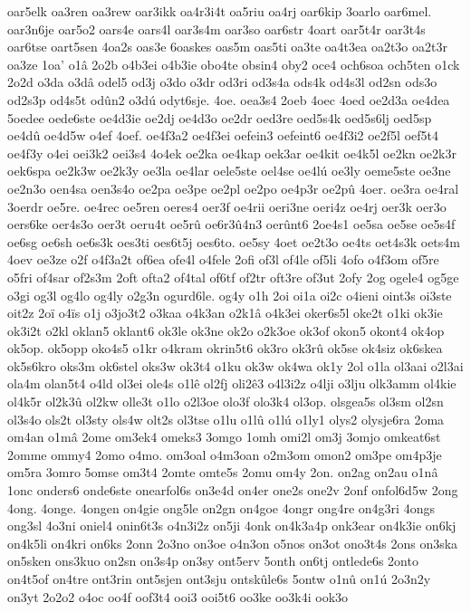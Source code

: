 {oar5elk
oa3ren
oa3rew
oar3ikk
oa4r3i4t
oa5riu
oa4rj
oar6kip
3oarlo
oar6mel.
oar3n6je
oar5o2
oars4e
oars4l
oar3s4m
oar3so
oar6str
4oart
oar5t4r
oar3t4s
oar6tse
oart5sen
4oa2s
oas3e
6oaskes
oas5m
oas5ti
oa3te
oa4t3ea
oa2t3o
oa2t3r
oa3ze
1oa'
o1â
2o2b
o4b3ei
o4b3ie
obo4te
obsin4
oby2
oce4
och6soa
och5ten
o1ck
2o2d
o3da
o3dâ
odel5
od3j
o3do
o3dr
od3ri
od3s4a
ods4k
od4s3l
od2sn
ods3o
od2s3p
od4s5t
odûn2
o3dú
odyt6sje.
4oe.
oea3s4
2oeb
4oec
4oed
oe2d3a
oe4dea
5oedee
oede6ste
oe4d3ie
oe2dj
oe4d3o
oe2dr
oed3re
oed5s4k
oed5s6lj
oed5sp
oe4dû
oe4d5w
o4ef
4oef.
oe4f3a2
oe4f3ei
oefein3
oefeint6
oe4f3i2
oe2f5l
oef5t4
oe4f3y
o4ei
oei3k2
oei3s4
4o4ek
oe2ka
oe4kap
oek3ar
oe4kit
oe4k5l
oe2kn
oe2k3r
oek6spa
oe2k3w
oe2k3y
oe3la
oe4lar
oele5ste
oel4se
oe4lú
oe3ly
oeme5ste
oe3ne
oe2n3o
oen4sa
oen3s4o
oe2pa
oe3pe
oe2pl
oe2po
oe4p3r
oe2pû
4oer.
oe3ra
oe4ral
3oerdr
oe5re.
oe4rec
oe5ren
oeres4
oer3f
oe4rii
oeri3ne
oeri4z
oe4rj
oer3k
oer3o
oers6ke
oer4s3o
oer3t
oeru4t
oe5rû
oe6r3û4n3
oerûnt6
2oe4s1
oe5sa
oe5se
oe5s4f
oe6sg
oe6sh
oe6s3k
oes3ti
oes6t5j
oes6to.
oe5sy
4oet
oe2t3o
oe4ts
oet4s3k
oets4m
4oev
oe3ze
o2f
o4f3a2t
of6ea
ofe4l
o4fele
2ofi
of3l
of4le
of5li
4ofo
o4f3om
of5re
o5fri
of4sar
of2s3m
2oft
ofta2
of4tal
of6tf
of2tr
oft3re
of3ut
2ofy
2og
ogele4
og5ge
o3gi
og3l
og4lo
og4ly
o2g3n
ogurd6le.
og4y
o1h
2oi
oi1a
oi2c
o4ieni
oint3s
oi3ste
oit2z
2oï
o4ïs
o1j
o3jo3t2
o3kaa
o4k3an
o2k1â
o4k3ei
oker6s5l
oke2t
o1ki
ok3ie
ok3i2t
o2kl
oklan5
oklant6
ok3le
ok3ne
ok2o
o2k3oe
ok3of
okon5
okont4
ok4op
ok5op.
ok5opp
oko4s5
o1kr
o4kram
okrin5t6
ok3ro
ok3rû
ok5se
ok4siz
ok6skea
ok5s6kro
oks3m
ok6stel
oks3w
ok3t4
o1ku
ok3w
ok4wa
ok1y
2ol
o1la
ol3aai
o2l3ai
ola4m
olan5t4
o4ld
ol3ei
ole4s
o1lê
ol2fj
oli2ê3
o4l3i2z
o4lji
o3lju
olk3amm
ol4kie
ol4k5r
ol2k3û
ol2kw
olle3t
o1lo
o2l3oe
olo3f
olo3k4
ol3op.
olsgea5s
ol3sm
ol2sn
ol3s4o
ols2t
ol3sty
ols4w
olt2s
ol3tse
o1lu
o1lû
o1lú
o1ly1
olys2
olysje6ra
2oma
om4an
o1mâ
2ome
om3ek4
omeks3
3omgo
1omh
omi2l
om3j
3omjo
omkeat6st
2omme
ommy4
2omo
o4mo.
om3oal
o4m3oan
o2m3om
omon2
om3pe
om4p3je
om5ra
3omro
5omse
om3t4
2omte
omte5s
2omu
om4y
2on.
on2ag
on2au
o1nâ
1onc
onders6
onde6ste
onearfol6s
on3e4d
on4er
one2s
one2v
2onf
onfol6d5w
2ong
4ong.
4onge.
4ongen
on4gie
ong5le
on2gn
on4goe
4ongr
ong4re
on4g3ri
4ongs
ong3sl
4o3ni
oniel4
onin6t3s
o4n3i2z
on5ji
4onk
on4k3a4p
onk3ear
on4k3ie
on6kj
on4k5li
on4kri
on6ks
2onn
2o3no
on3oe
o4n3on
o5nos
on3ot
ono3t4s
2ons
on3ska
on5sken
ons3kuo
on2sn
on3s4p
on3sy
ont5erv
5onth
on6tj
ontlede6s
2onto
on4t5of
on4tre
ont3rin
ont5sjen
ont3sju
ontskûle6s
5ontw
o1nû
on1ú
2o3n2y
on3yt
2o2o2
o4oc
oo4f
oof3t4
ooi3
ooi5t6
oo3ke
oo3k4i
ook3o
}
